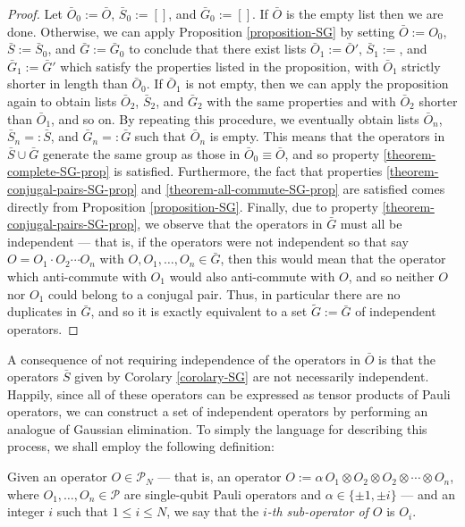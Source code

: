 \documentclass[twocolumn,showpacs,preprintnumbers,amsmath,amssymb,nofootinbib,pra,floatfix]{revtex4}
\newenvironment{definition}[1][Definition]{\begin{trivlist}
\item[\hskip \labelsep {\bfseries #1}]}{\end{trivlist}}
\newenvironment{remark}[1][Remark]{\begin{trivlist}
\item[\hskip \labelsep {\bfseries #1}]}{\end{trivlist}}
\begin{document}
\begin{proof}
Let $\bar O_0:=\bar O$, $\bar S_0:=[]$, and $\bar G_0:=[]$.  If $\bar O$ is the empty list then we are done.  Otherwise, we can apply Proposition \ref{proposition-SG} by setting $\bar O := O_0$, $\bar S:=\bar S_0$, and $\bar G := \bar G_0$ to conclude that there exist lists $\bar O_1:=\bar O'$, $\bar S_1:=$, and $\bar G_1:=\bar G'$ which satisfy the properties listed in the proposition, with $\bar O_1$ strictly shorter in length than $\bar O_0$.  If $\bar O_1$ is not empty, then we can apply the proposition again to obtain lists $\bar O_2$, $\bar S_2$, and $\bar G_2$ with the same properties and with $\bar O_2$ shorter than $\bar O_1$, and so on.  By repeating this procedure, we eventually obtain lists $\bar O_n$, $\bar S_n=:\bar S$, and $\bar G_n=:\bar G$ such that $\bar O_n$ is empty.  This means that the operators in $\bar S \cup \bar G$ generate the same group as those in $\bar O_0\equiv \bar O$, and so property \ref{theorem-complete-SG-prop} is satisfied.  Furthermore, the fact that properties \ref{theorem-conjugal-pairs-SG-prop} and \ref{theorem-all-commute-SG-prop} are satisfied comes directly from Proposition \ref{proposition-SG}.  Finally, due to property \ref{theorem-conjugal-pairs-SG-prop}, we observe that the operators in $\bar G$ must all be independent --- that is, if the operators were not independent so that say $O=O_1\cdot O_2\cdots O_n$ with $O,O_1,\dots,O_n\in\bar G$, then this would mean that the operator which anti-commute with $O_1$ would also anti-commute with $O$, and so neither $O$ nor $O_1$ could belong to a conjugal pair.  Thus, in particular there are no duplicates in $\bar G$, and so it is exactly equivalent to a set $\tilde G:=\bar G$ of independent operators.
\end{proof}

\begin{remark}
A consequence of not requiring independence of the operators in $\bar O$ is that the operators $\bar S$ given by Corolary \ref{corolary-SG} are not necessarily independent.  Happily, since all of these operators can be expressed as tensor products of Pauli operators, we can construct a set of independent operators by performing an analogue of Gaussian elimination.  To simply the language for describing this process, we shall employ the following definition:
\end{remark}

\begin{definition}
Given an operator $O\in \mathcal{P}_N$ --- that is, an operator $O:=\alpha \,O_1\otimes O_2 \otimes O_2 \otimes \cdots \otimes O_n$, where $O_1,\dots,O_n\in\mathcal{P}$ are single-qubit Pauli operators and $\alpha\in\{\pm 1, \pm i\}$ --- and an integer $i$ such that $1\leq i \leq N$, we say that the \emph{$i$-th sub-operator of $O$} is $O_i$.
\end{definition}
\end{document}
